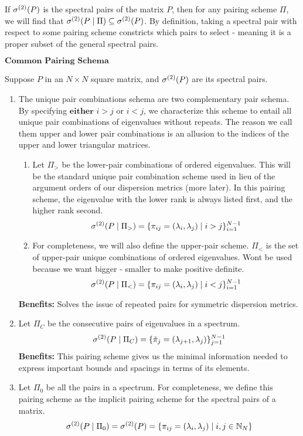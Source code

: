 \begin{remark} If ${\sigma^{(2)}}(P)$ is the spectral pairs of the matrix $P$, then for any pairing scheme $\Pi$, we will find that ${\sigma^{(2)}}(P \mid \Pi) \subseteq {\sigma^{(2)}}(P)$. By definition, taking a spectral pair with respect to some pairing scheme constricts which pairs to select - meaning it is a proper subset of the general spectral pairs.
\end{remark}

\newpage

\begin{center}
$\textbf{Common Pairing Schema}$
\end{center}

Suppose $P$ in an $N \times N$ square matrix, and ${\sigma^{(2)}}(P)$ are its spectral pairs.

\begin{enumerate}
  \item The unique pair combinations schema are two complementary pair schema. By specifying $\textbf{either}$ $i > j$ or $i < j$, we characterize this scheme to entail all unique pair combinations of eigenvalues without repeats. The reason we call them upper and lower pair combinations is an allusion to the indices of the upper and lower triangular matrices. \begin{enumerate}
    \item Let $\Pi_>$ be the lower-pair combinations of ordered eigenvalues. This will be the standard unique pair combination scheme used in lieu of the argument orders of our dispersion metrics (more later). In this pairing scheme, the eigenvalue with the lower rank is always listed first, and the higher rank second.
    $${\sigma^{(2)}}(P \mid \Pi_>) = \{\pi_{ij} = (\lambda_i,\lambda_j) \mid i > j\}_{i = 1}^{N-1}$$
    \item For completeness, we will also define the upper-pair scheme. $\Pi_<$ is the set of upper-pair unique combinations of ordered eigenvalues. Wont be used because we want bigger - smaller to make positive definite.
    $${\sigma^{(2)}}(P \mid \Pi_<) = \{\pi_{ij} = (\lambda_i,\lambda_j) \mid i < j\}_{i = 1}^{N-1}$$
  \end{enumerate}
  \textbf{Benefits:} Solves the issue of repeated pairs for symmetric dispersion metrics.
\item Let $\Pi_C$ be the consecutive pairs of eigenvalues in a spectrum.
  $${\sigma^{(2)}}(P \mid \Pi_C) = \{{\tilde{\pi}}_{j} = (\lambda_{j + 1},\lambda_j)\}_{j = 1}^{N-1}$$
  \textbf{Benefits:} This pairing scheme gives us the minimal information needed to express important bounds and spacings in terms of its elements.
  \item Let $\Pi_0$ be all the pairs in a spectrum. For completeness, we define this pairing scheme as the implicit pairing scheme for the spectral pairs of a matrix.
  $${\sigma^{(2)}}(P \mid \Pi_0) = {\sigma^{(2)}}(P) = \{\pi_{ij} = (\lambda_{i},\lambda_j) \mid i,j \in \mathbb{N}_N\}$$
\end{enumerate}

